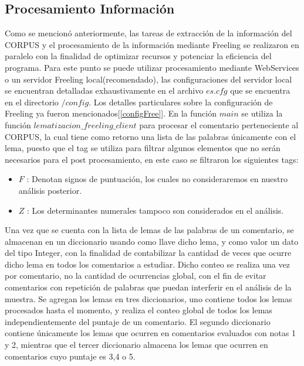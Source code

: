 \documentclass[12pt]{article}
\begin{document}
\subsection{Procesamiento Información} \label{proc}
Como se mencionó anteriormente, las tareas de extracción de la información del CORPUS y el procesamiento de la información mediante Freeling se realizaron en paralelo con la finalidad de optimizar recursos y potenciar la eficiencia del programa. Para este punto se puede utilizar procesamiento mediante WebServices o un servidor Freeling local(recomendado), las configuraciones del servidor local se encuentran detalladas exhaustivamente en el archivo $es.cfg$ que se encuentra en el directorio $/config$. Los detalles particulares sobre la configuración de Freeling ya fueron mencionados[\ref{configFree}].
En la función $main$ se utiliza la función $lematizacion\_freeling\_client$ para procesar el comentario perteneciente al CORPUS, la cual tiene como retorno una lista de las palabras únicamente con el lema, puesto que el tag se utiliza para filtrar algunos elementos que no serán necesarios para el post procesamiento, en este caso se filtraron los siguientes tags:
\begin{itemize}
  \item $F$ : Denotan signos de puntuación, los cuales no consideraremos en nuestro análisis posterior.
  \item $Z$ : Los determinantes numerales tampoco son considerados en el análisis. 
\end{itemize}
Una vez que se cuenta con la lista de lemas de las palabras de un comentario, se almacenan en un diccionario usando como llave dicho lema, y como valor un dato del tipo Integer, con la finalidad de contabilizar la cantidad de veces que ocurre dicho lema en todos los comentarios a estudiar. Dicho conteo se realiza una vez por comentario, no la cantidad de ocurrencias global, con el fin de evitar comentarios con repetición de palabras que puedan interferir en el análisis de la muestra.
Se agregan los lemas en tres diccionarios, uno contiene todos los lemas procesados hasta el momento, y realiza el conteo global de todos los lemas independientemente del puntaje de un comentario. El segundo diccionario contiene únicamente los lemas que ocurren en comentarios evaluados con notas 1 y 2, mientras que el tercer diccionario almacena los lemas que ocurren en comentarios cuyo puntaje es 3,4 o 5. 
\end{document}
